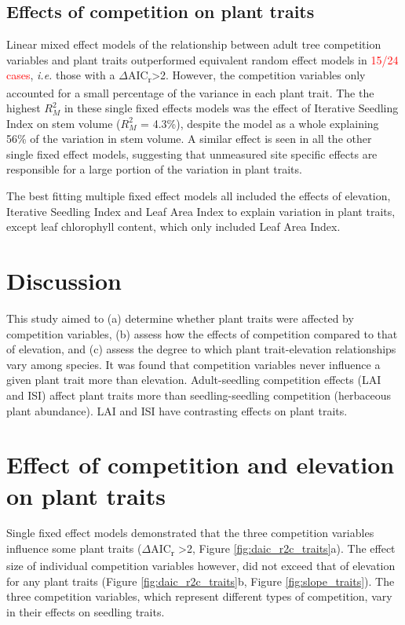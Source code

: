 \documentclass[a4paper,11pt]{article}
\newcommand{\todo}[1]{\textcolor{red}{#1}}   %
\begin{document}
\subsection{Effects of competition on plant traits}

Linear mixed effect models of the relationship between adult tree competition variables and plant traits outperformed equivalent random effect models in \todo{15/24 cases}, \textit{i.e.} those with a $\Delta$AIC\textsubscript{r}>2. However, the competition variables only accounted for a small percentage of the variance in each plant trait. The the highest $R_M^2$ in these single fixed effects models was the effect of Iterative Seedling Index on stem volume ($R_M^2$ = 4.3\%), despite the model as a whole explaining 56\% of the variation in stem volume. A similar effect is seen in all the other single fixed effect models, suggesting that unmeasured site specific effects are responsible for a large portion of the variation in plant traits.

The best fitting multiple fixed effect models all included the effects of elevation, Iterative Seedling Index and Leaf Area Index to explain variation in plant traits, except leaf chlorophyll content, which only included Leaf Area Index. 


\section*{Discussion}

This study aimed to (a) determine whether plant traits were affected by competition variables, (b) assess how the effects of competition compared to that of elevation, and (c) assess the degree to which plant trait-elevation relationships vary among species. It was found that competition variables never influence a given plant trait more than elevation. Adult-seedling competition effects (LAI and ISI) affect plant traits more than seedling-seedling competition (herbaceous plant abundance). LAI and ISI have contrasting effects on plant traits.

\section{Effect of competition and elevation on plant traits}
Single fixed effect models demonstrated that the three competition variables influence some plant traits ($\Delta$AIC\textsubscript{r} >2, Figure \ref{fig:daic_r2c_traits}a). The effect size of individual competition variables however, did not exceed that of elevation for any plant traits (Figure \ref{fig:daic_r2c_traits}b, Figure \ref{fig:slope_traits}).  The three competition variables, which represent different types of competition, vary in their effects on seedling traits.
\end{document}
